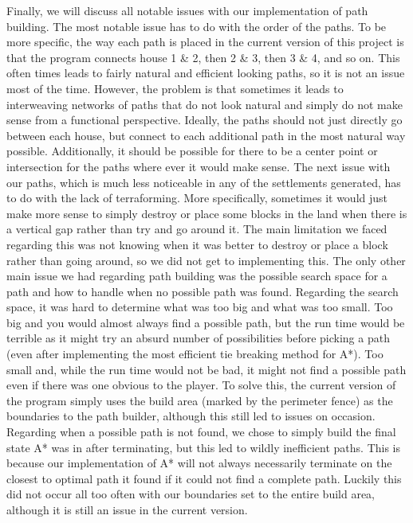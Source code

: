 \documentclass[11pt, oneside]{article}
\begin{document}
\begin{normalsize}
Finally, we will discuss all notable issues with our implementation of path building. 
The most notable issue has to do with the order of the paths. 
To be more specific, the way each path is placed in the current version of this project is that the program connects house 1 \& 2, then 2 \& 3, then 3 \& 4, and so on. 
This often times leads to fairly natural and efficient looking paths, so it is not an issue most of the time. 
However, the problem is that sometimes it leads to interweaving networks of paths that do not look natural and simply do not make sense from a functional perspective. 
Ideally, the paths should not just directly go between each house, but connect to each additional path in the most natural way possible. 
Additionally, it should be possible for there to be a center point or intersection for the paths where ever it would make sense. 
The next issue with our paths, which is much less noticeable in any of the settlements generated, has to do with the lack of terraforming. 
More specifically, sometimes it would just make more sense to simply destroy or place some blocks in the land when there is a vertical gap rather than try and go around it. 
The main limitation we faced regarding this was not knowing when it was better to destroy or place a block rather than going around, so we did not get to implementing this. 
The only other main issue we had regarding path building was the possible search space for a path and how to handle when no possible path was found. 
Regarding the search space, it was hard to determine what was too big and what was too small. 
Too big and you would almost always find a possible path, but the run time would be terrible as it might try an absurd number of possibilities before picking a path (even after implementing the most efficient tie breaking method for A*).
Too small and, while the run time would not be bad, it might not find a possible path even if there was one obvious to the player. 
To solve this, the current version of the program simply uses the build area (marked by the perimeter fence) as the boundaries to the path builder, although this still led to issues on occasion. 
Regarding when a possible path is not found, we chose to simply build the final state A* was in after terminating, but this led to wildly inefficient paths.  
This is because our implementation of A* will not always necessarily terminate on the closest to optimal path it found if it could not find a complete path.
Luckily this did not occur all too often with our boundaries set to the entire build area, although it is still an issue in the current version.  


\end{normalsize}
\end{document}
